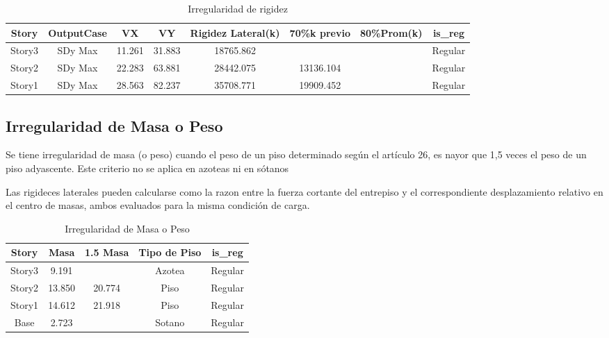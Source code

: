 \documentclass{article}%
\begin{document}
%


\begin{table}[h!]%
\centering%
\caption{Irregularidad de rigidez}%
\begin{tabular}{cccccccc}
\toprule
Story & OutputCase & VX & VY & Rigidez Lateral(k) & 70\%k previo & 80\%Prom(k) & is\_reg \\
\midrule
Story3 & SDy Max & 11.261 & 31.883 & 18765.862 &  &  & Regular \\
Story2 & SDy Max & 22.283 & 63.881 & 28442.075 & 13136.104 &  & Regular \\
Story1 & SDy Max & 28.563 & 82.237 & 35708.771 & 19909.452 &  & Regular \\
\bottomrule
\end{tabular}
%
\end{table}

%
\subsection{Irregularidad de Masa o Peso}%
\label{subsec:IrregularidaddeMasaoPeso}%
\begin{tcolorbox}[colback=gray!5!white,colframe=cyan!75!black,fonttitle=\bfseries,title=Tabla N°9 E-030]%
Se tiene irregularidad de masa (o peso) cuando el peso de un piso determinado según el artículo 26, es nayor que 1,5 veces el peso de un piso adyascente. Este criterio no se aplica en azoteas ni en sótanos%
\end{tcolorbox}%
Las rigideces laterales pueden calcularse como la razon entre la fuerza cortante del entrepiso y el correspondiente desplazamiento relativo en el centro de masas, ambos evaluados para la misma condición de carga. \newline%
%


\begin{table}[h!]%
\centering%
\caption{Irregularidad de Masa o Peso}%
\begin{tabular}{ccccc}
\toprule
Story & Masa & 1.5 Masa & Tipo de Piso & is\_reg \\
\midrule
Story3 & 9.191 &  & Azotea & Regular \\
Story2 & 13.850 & 20.774 & Piso & Regular \\
Story1 & 14.612 & 21.918 & Piso & Regular \\
Base & 2.723 &  & Sotano & Regular \\
\bottomrule
\end{tabular}
%
\end{table}
\end{document}
